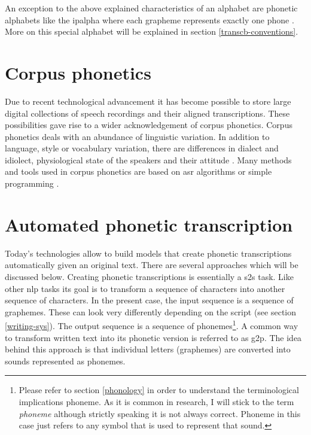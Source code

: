 
An exception to the above explained characteristics of an alphabet are phonetic alphabets like the \ac{ipalpha} where each grapheme represents exactly one phone  \citep{writing-systems}. More on this special alphabet will be explained in section \ref{transcb-conventions}.



\section{Corpus phonetics}
Due to recent technological advancement it has become possible to store large digital collections of speech recordings and their aligned transcriptions. These possibilities gave rise to a wider acknowledgement of corpus phonetics. Corpus phonetics deals with an abundance of linguistic variation. In addition to language, style or vocabulary variation, there are differences in dialect and idiolect, physiological state of the speakers and their attitude \citep{Liberman.2019, Chodroff.19.07.2019}. Many methods and tools used in corpus phonetics are based on \ac{asr} algorithms or simple programming \citep{Chodroff.19.07.2019}.

\section{Automated phonetic transcription}
Today's technologies allow to build models that create phonetic transcriptions automatically given an original text. There are several approaches which will be discussed below. Creating phonetic transcriptions is essentially a \ac{s2s} task. Like other \ac{nlp} tasks its goal is to transform a sequence of characters into another sequence of characters. In the present case, the input sequence is a sequence of graphemes. These can look very differently depending on the script (see section \ref{writing-sys}). The output sequence is a sequence of phonemes\footnote[1]{Please refer to section \ref{phonology} in order to understand the terminological implications phoneme. As it is common in research, I will stick to the term \textit{phoneme} although strictly speaking it is not always correct. Phoneme in this case just refers to any symbol that is used to represent that sound.}. A common way to transform written text into its phonetic version is referred to as \ac{g2p}. The idea behind this approach is that individual letters (graphemes) are converted into sounds represented as phonemes.  

